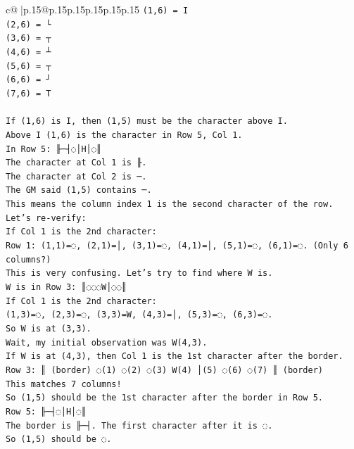 \documentclass{article}
\begin{document}
{\begin{supertabular}{c@{$\;$}|p{.15\linewidth}@{}p{.15\linewidth}p{.15\linewidth}p{.15\linewidth}p{.15\linewidth}p{.15\linewidth}}
{{{\texttt{(1,6) = I} \\
\texttt{(2,6) = └} \\
\texttt{(3,6) = ┬} \\
\texttt{(4,6) = ┴} \\
\texttt{(5,6) = ┬} \\
\texttt{(6,6) = ┘} \\
\texttt{(7,6) = T} \\
\\ 
\texttt{If (1,6) is I, then (1,5) must be the character above I.} \\
\texttt{Above I (1,6) is the character in Row 5, Col 1.} \\
\texttt{In Row 5: ╟─┤◌│H│◌║} \\
\texttt{The character at Col 1 is ╟.} \\
\texttt{The character at Col 2 is ─.} \\
\texttt{The GM said (1,5) contains ─.} \\
\texttt{This means the column index 1 is the second character of the row.} \\
\texttt{Let's re{-}verify:} \\
\texttt{If Col 1 is the 2nd character:} \\
\texttt{Row 1: (1,1)=◌, (2,1)=│, (3,1)=◌, (4,1)=│, (5,1)=◌, (6,1)=◌. (Only 6 columns?)} \\
\texttt{This is very confusing. Let's try to find where W is.} \\
\texttt{W is in Row 3: ║◌◌◌W│◌◌║} \\
\texttt{If Col 1 is the 2nd character:} \\
\texttt{(1,3)=◌, (2,3)=◌, (3,3)=W, (4,3)=│, (5,3)=◌, (6,3)=◌.} \\
\texttt{So W is at (3,3).} \\
\texttt{Wait, my initial observation was W(4,3).} \\
\texttt{If W is at (4,3), then Col 1 is the 1st character after the border.} \\
\texttt{Row 3: ║ (border) ◌(1) ◌(2) ◌(3) W(4) │(5) ◌(6) ◌(7) ║ (border)} \\
\texttt{This matches 7 columns!} \\
\texttt{So (1,5) should be the 1st character after the border in Row 5.} \\
\texttt{Row 5: ╟─┤◌│H│◌║} \\
\texttt{The border is ╟─┤. The first character after it is ◌.} \\
\texttt{So (1,5) should be ◌.} \\
}}}
\end{supertabular}}
\end{document}
